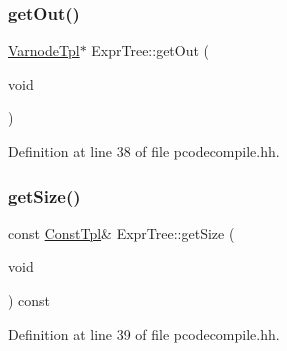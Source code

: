 \subsubsection{\texorpdfstring{getOut()}{getOut()}}
{\footnotesize\ttfamily \mbox{\hyperlink{class_varnode_tpl}{Varnode\+Tpl}}$\ast$ Expr\+Tree\+::get\+Out (\begin{DoxyParamCaption}\item[{void}]{ }\end{DoxyParamCaption})\hspace{0.3cm}{\ttfamily [inline]}}



Definition at line 38 of file pcodecompile.\+hh.

\mbox{\label{class_expr_tree_a485a318132f134d7f0d4793030dc28c9}} 
\subsubsection{\texorpdfstring{getSize()}{getSize()}}
{\footnotesize\ttfamily const \mbox{\hyperlink{class_const_tpl}{Const\+Tpl}}\& Expr\+Tree\+::get\+Size (\begin{DoxyParamCaption}\item[{void}]{ }\end{DoxyParamCaption}) const\hspace{0.3cm}{\ttfamily [inline]}}



Definition at line 39 of file pcodecompile.\+hh.


